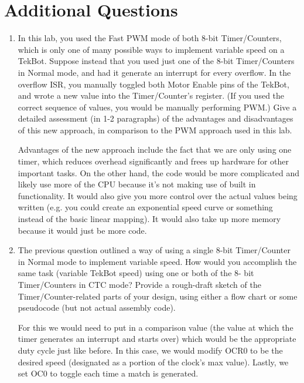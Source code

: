 \documentclass[12pt,letterpaper]{article}
\begin{document}
\section{Additional Questions}
\begin{enumerate}
    \item
    In this lab, you used the Fast PWM mode of both 8-bit Timer/Counters,
    which is only one of many possible ways to implement variable speed on a
    TekBot. Suppose instead that you used just one of the 8-bit Timer/Counters
    in Normal mode, and had it generate an interrupt for every overflow. In the
    overflow ISR, you manually toggled both Motor Enable pins of the TekBot,
    and wrote a new value into the Timer/Counter’s register. (If you used the
    correct sequence of values, you would be manually performing PWM.) Give a
    detailed assessment (in 1-2 paragraphs) of the advantages and disadvantages
    of this new approach, in comparison to the PWM approach used in this lab.
    
    Advantages of the new approach include the fact that we are only using one timer, which reduces overhead significantly and frees up hardware for other important tasks. On the other hand, the code would be more complicated and likely use more of the CPU because it's not making use of built in functionality. It would also give you more control over the actual values being written (e.g. you could create an exponential speed curve or something instead of the basic linear mapping). It would also take up more memory because it would just be more code.
    
    \item
    The previous question outlined a way of using a single 8-bit Timer/Counter
    in Normal mode to implement variable speed. How would you accomplish
    the same task (variable TekBot speed) using one or both of the 8-
    bit Timer/Counters in CTC mode? Provide a rough-draft sketch of the
    Timer/Counter-related parts of your design, using either a flow chart or
    some pseudocode (but not actual assembly code).

	For this we would need to put in a comparison value (the value at which the timer generates an interrupt and starts over) which would be the appropriate duty cycle just like before. In this case, we would modify OCR0 to be the desired speed (designated as a portion of the clock's max value). Lastly, we set OC0 to toggle each time a match is generated.

\end{enumerate}
\end{document}
